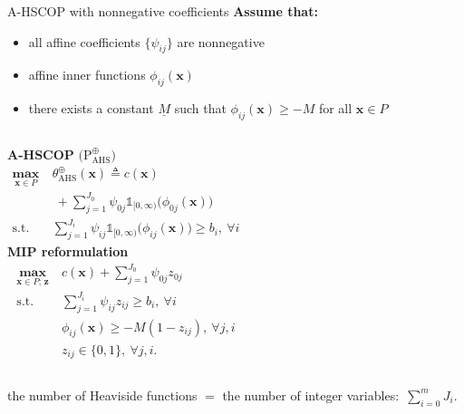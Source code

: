 \documentclass[aspectratio=169,xcolor=dvipsnames]{beamer}
\begin{document}
\begin{frame}{A-HSCOP with nonnegative coefficients}
  \footnotesize
  \textbf{Assume that:}
  \begin{itemize}
    \setlength{\itemsep}{0.02cm}
    \item \textcolor{MediumRed}{all affine coefficients $\{\psi_{ij}\}$ are
      nonnegative}
    \item affine inner functions $\phi_{ij}(\mathbf{x})$
    \item there exists a constant $\underline{M}$ such that
      $\phi_{ij}(\mathbf{x})\geq -M$ for all $\mathbf{x}\in P$
  \end{itemize}

  \vspace{0.06cm}
  \begin{columns}[t,onlytextwidth]
    \textbf{A-HSCOP} $\bigl(\mathrm{P}^{\oplus}_{\mathrm{AHS}}\bigr)$
    \[
      \begin{aligned}
        \operatorname*{\textbf{max}}_{\mathbf{x}\in P}\
        &\theta^{\oplus}_{\mathrm{AHS}}(\mathbf{x})\triangleq c(\mathbf{x})\\
        &\ +\sum_{j=1}^{J_0}\psi_{0j}\mathds{1}_{[0,\infty)}
          \bigl(\phi_{0j}(\mathbf{x})\bigr)\\[2pt]
        \text{s.t.}\
        &\sum_{j=1}^{J_i}\psi_{ij}\mathds{1}_{[0,\infty)}
          \bigl(\phi_{ij}(\mathbf{x})\bigr)\geq b_i,\ \forall i
      \end{aligned}
    \]
    \textbf{MIP reformulation}
    \[
      \begin{aligned}
        \operatorname*{\textbf{max}}_{\mathbf{x}\in P;\,\mathbf{z}}\
        &c(\mathbf{x})+\sum_{j=1}^{J_0}\psi_{0j}z_{0j}\\
        \text{s.t.}\
        &\sum_{j=1}^{J_i}\psi_{ij}z_{ij}\geq b_i,\ \forall i\\
        &\phi_{ij}(\mathbf{x})\geq -M(1-z_{ij}),\ \forall j,i\\
        &z_{ij}\in\{0,1\},\ \forall j,i.
      \end{aligned}
    \]
  \end{columns}

  \vspace{0.04cm}
  the number of Heaviside functions $=$ the number of integer variables:\
  $\displaystyle\sum_{i=0}^{m} J_i.$
\end{frame}
\end{document}
